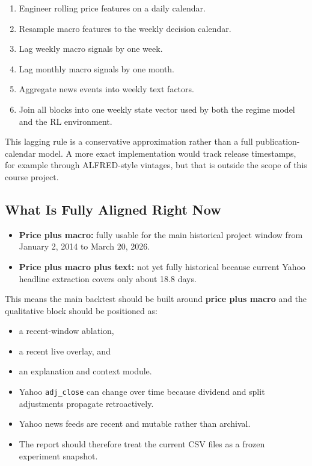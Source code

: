 \documentclass[11pt,a4paper]{article}
\begin{document}
\begin{insightbox}[title=\textbf{Alignment Strategy}]
\begin{enumerate}[leftmargin=1.5em]
  \item Engineer rolling price features on a daily calendar.
  \item Resample macro features to the weekly decision calendar.
  \item Lag weekly macro signals by one week.
  \item Lag monthly macro signals by one month.
  \item Aggregate news events into weekly text factors.
  \item Join all blocks into one weekly state vector used by both the regime model and the RL environment.
\end{enumerate}
\end{insightbox}

This lagging rule is a conservative approximation rather than a full publication-calendar model. A more exact implementation would track release timestamps, for example through ALFRED-style vintages, but that is outside the scope of this course project.

\subsection{What Is Fully Aligned Right Now}

\begin{itemize}[leftmargin=1.4em]
  \item \textbf{Price plus macro:} fully usable for the main historical project window from January 2, 2014 to March 20, 2026.
  \item \textbf{Price plus macro plus text:} not yet fully historical because current Yahoo headline extraction covers only about 18.8 days.
\end{itemize}

This means the main backtest should be built around \textbf{price plus macro} and the qualitative block should be positioned as:

\begin{itemize}[leftmargin=1.4em]
  \item a recent-window ablation,
  \item a recent live overlay, and
  \item an explanation and context module.
\end{itemize}

\begin{warningbox}[title=\textbf{Reproducibility Notes}]
\begin{itemize}[leftmargin=1.4em]
  \item Yahoo \texttt{adj\_close} can change over time because dividend and split adjustments propagate retroactively.
  \item Yahoo news feeds are recent and mutable rather than archival.
  \item The report should therefore treat the current CSV files as a frozen experiment snapshot.
\end{itemize}
\end{warningbox}
\end{document}
